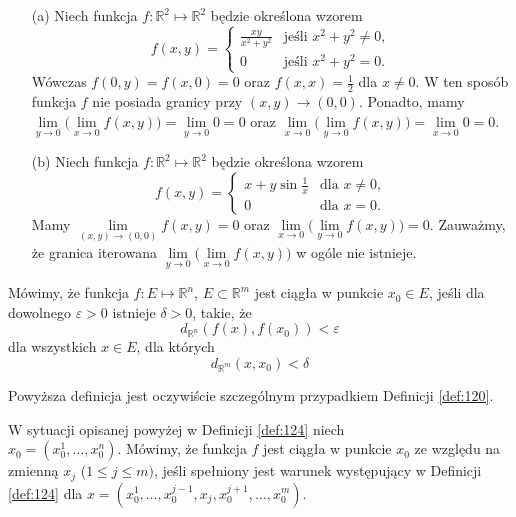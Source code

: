 \documentclass[leqno]{article}
\begin{document}
\begin{justify}
\begin{ex}
\begin{itemize}
    \item [(a)]
        Niech funkcja $f : \mathbb{R}^2 \mapsto \mathbb{R}^2$ będzie określona wzorem
        \[
            f(x, y) = \begin{cases}
                \frac{xy}{x^2+y^2} & \text{jeśli } x^2 + y^2 \neq 0, \\
                0 & \text{jeśli } x^2 + y^2 = 0.
                \end{cases}
        \]
        Wówczas $f(0, y) = f(x, 0) = 0$ oraz $f(x, x) = \frac{1}{2}$ dla $x \neq 0$.
        W ten sposób funkcja $f$ nie posiada granicy przy $(x, y) \to (0, 0)$.
        Ponadto, mamy $\lim\limits_{y \to 0}\Big(\lim\limits_{x \to 0}f(x, y)\Big) = \lim\limits_{y \to 0}0 = 0$
        oraz $\lim\limits_{x \to 0}\Big(\lim\limits_{y \to 0}f(x, y)\Big) = \lim\limits_{x \to 0}0 = 0$.
    \item [(b)]
        Niech funkcja $f : \mathbb{R}^2 \mapsto \mathbb{R}^2$ będzie określona wzorem 
        \[
            f(x, y) = \begin{cases}
                x + y \sin \frac{1}{x} & \text{dla } x \neq 0, \\
                0                      & \text{dla } x = 0.
            \end{cases}
        \]
        Mamy $\lim\limits_{(x, y) \to (0,0)}f(x, y) = 0$ oraz $\lim\limits_{x \to 0}\Big(\lim\limits_{y \to 0}f(x, y)\Big) = 0$.
        Zauważmy, że granica iterowana $\lim\limits_{y \to 0}\Big(\lim\limits_{x \to 0}f(x, y)\Big)$ w ogóle nie istnieje.
\end{itemize}
\end{ex}

\begin{defn}
    Mówimy, że funkcja $f : E \mapsto \mathbb{R}^n$, $E \subset \mathbb{R}^m$ jest ciągła w punkcie $x_0 \in E$, 
    jeśli dla dowolnego $\varepsilon > 0$ istnieje $\delta > 0$, takie, że 
    \[
        d_{\mathbb{R}^n}(f(x), f(x_0)) < \varepsilon
    \]
    dla wszystkich $x \in E$, dla których
    \[
        d_{\mathbb{R}^m}(x, x_0) < \delta
    \]
\end{defn}

Powyższa definicja jest oczywiście szczególnym przypadkiem Definicji \ref{def:120}.

\begin{defn}
    W sytuacji opisanej powyżej w Definicji \ref{def:124} niech \\ $x_0 = (x_0^1, \ldots, x_0^n)$.
    Mówimy, że funkcja $f$ jest ciągła w punkcie $x_0$ ze względu na zmienną $x_j$ ($1 \leqslant j \leqslant m)$,
    jeśli spełniony jest warunek występujący w Definicji \ref{def:124} dla $x = (x_0^1, \ldots, x_0^{j-1}, x_j, x_0^{j+1}, \ldots, x_0^m)$.
\end{defn}


\end{justify}
\end{document}
